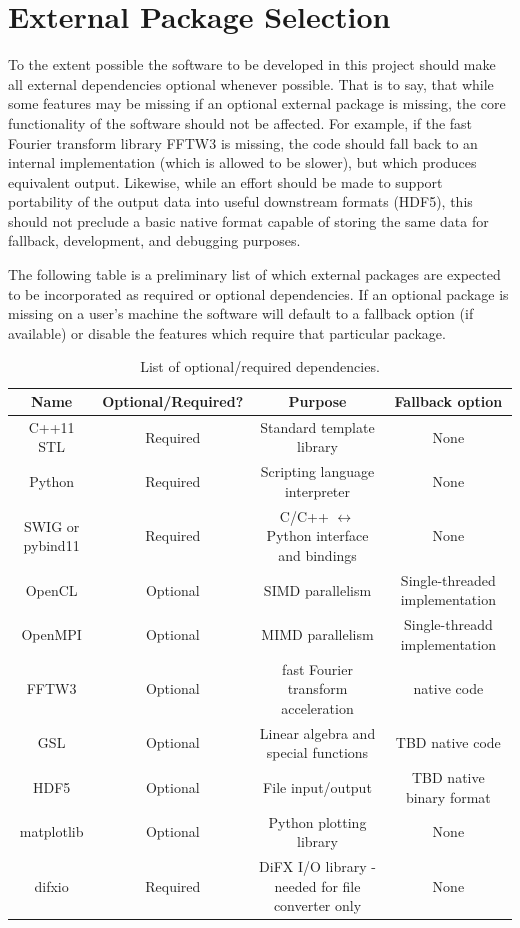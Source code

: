 \documentclass[hidelinks]{article}
\let\Oldsection\section
\renewcommand{\section}{\FloatBarrier\Oldsection}
\begin{document}
\section{External Package Selection}

To the extent possible the software to be developed in this project should make all external dependencies optional whenever possible. That is to say, that
while some features may be missing if an optional external package is missing, the core functionality of the software should not be affected. For example, if the fast Fourier transform library FFTW3 is missing, the code should fall back to an internal implementation (which is allowed to be slower), but which produces equivalent output. Likewise, while an effort should be made to support portability of the output data into useful downstream formats (HDF5), this should not preclude a
basic native format capable of storing the same data for fallback, development, and debugging purposes.

The following table is a preliminary list of which external packages are expected to be incorporated as required or optional dependencies. If an optional package is missing on a user's machine the software will default to a fallback option (if available) or disable the features which require that particular package.

\begin{center}
\begin{table}[h!]
\begin{adjustbox}{width=\textwidth}
\begin{tabular}{|c|c|c|c|}
\hline
Name & Optional/Required? & Purpose & Fallback option \\ \hline
C++11 STL & Required & Standard template library & None \\ \hline
Python &  Required & Scripting language interpreter & None \\ \hline
SWIG or pybind11 & Required & C/C++ $\leftrightarrow$ Python interface and bindings & None \\ \hline
OpenCL & Optional & SIMD parallelism & Single-threaded implementation \\ \hline
OpenMPI & Optional & MIMD parallelism & Single-threadd implementation \\ \hline
FFTW3 & Optional & fast Fourier transform acceleration & native code \\ \hline
GSL & Optional & Linear algebra and special functions & TBD native code \\ \hline
HDF5 & Optional & File input/output & TBD native binary format \\ \hline
matplotlib & Optional & Python plotting library & None \\ \hline
difxio & Required & DiFX I/O library - needed for file converter only & None \\ \hline
\end{tabular}
\end{adjustbox}
\caption{List of optional/required dependencies.}
\label{tab:dep}
\end{table}
\end{center}
\end{document}
